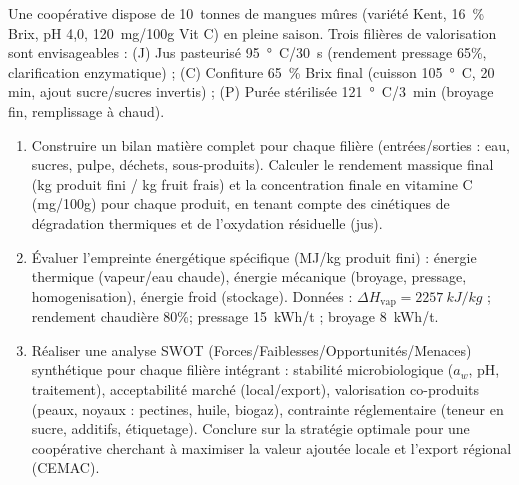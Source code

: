 \documentclass[11pt]{article}
\begin{document}
\begin{exercice}
Une coopérative dispose de \SI{10}{tonnes} de mangues mûres (variété Kent, \SI{16}{\%} Brix, pH 4,0, \SI{120}{mg/100g} Vit C) en pleine saison. Trois filières de valorisation sont envisageables : (J) Jus pasteurisé \SI{95}{°C}/\SI{30}{s} (rendement pressage 65\%, clarification enzymatique) ; (C) Confiture \SI{65}{\%} Brix final (cuisson \SI{105}{°C}, 20 min, ajout sucre/sucres invertis) ; (P) Purée stérilisée \SI{121}{°C}/\SI{3}{min} (broyage fin, remplissage à chaud).
\begin{enumerate}
    \item Construire un bilan matière complet pour chaque filière (entrées/sorties : eau, sucres, pulpe, déchets, sous-produits). Calculer le rendement massique final (kg produit fini / kg fruit frais) et la concentration finale en vitamine C (mg/100g) pour chaque produit, en tenant compte des cinétiques de dégradation thermiques et de l'oxydation résiduelle (jus).
    \item Évaluer l'empreinte énergétique spécifique (MJ/kg produit fini) : énergie thermique (vapeur/eau chaude), énergie mécanique (broyage, pressage, homogenisation), énergie froid (stockage). Données : $\Delta H_{\text{vap}} = \SI{2257}{kJ/kg}$ ; rendement chaudière 80\%; pressage \SI{15}{kWh/t} ; broyage \SI{8}{kWh/t}.
    \item Réaliser une analyse SWOT (Forces/Faiblesses/Opportunités/Menaces) synthétique pour chaque filière intégrant : stabilité microbiologique ($a_w$, pH, traitement), acceptabilité marché (local/export), valorisation co-produits (peaux, noyaux : pectines, huile, biogaz), contrainte réglementaire (teneur en sucre, additifs, étiquetage). Conclure sur la stratégie optimale pour une coopérative cherchant à maximiser la valeur ajoutée locale et l'export régional (CEMAC).
\end{enumerate}
\end{exercice}
\end{document}
